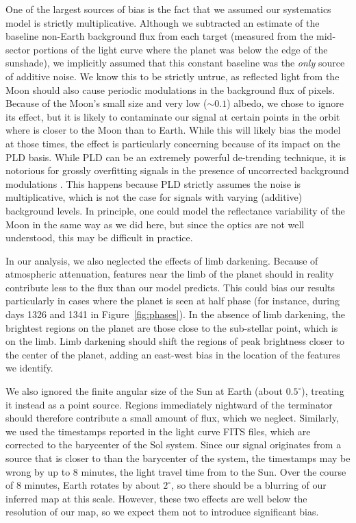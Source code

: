 \documentclass[modern]{aastex62}
\begin{document}
One of the largest sources of bias is the fact that we assumed our
systematics model is strictly multiplicative. Although we subtracted
an estimate of the baseline non-Earth background flux from each target
(measured from the mid-sector portions of the light curve where the
planet was below the edge of the sunshade), we implicitly assumed
that this constant baseline was the \emph{only} source of additive
noise. We know this to be strictly untrue, as reflected light from the Moon 
should also cause periodic modulations
in the background flux of \TESS pixels. Because of the Moon's small size and
very low ($\sim 0.1$) albedo, we chose to ignore its effect, but it
is likely to contaminate our signal at certain points in the orbit
where \TESS is closer to the Moon than to Earth. While this will
likely bias the \starry model at those times, the effect is particularly
concerning because of its impact on the PLD basis. While PLD can be an
extremely powerful de-trending technique, it is notorious for
grossly overfitting signals in the presence of uncorrected background
modulations \citep{Luger2016}. This happens because PLD strictly
assumes the noise is multiplicative, which is not the case for 
signals with varying (additive) background levels. In principle, one
could model the reflectance variability of the Moon in the same way as
we did here, but since the optics are not well understood, this 
may be difficult in practice. 

In our analysis, we also neglected the effects of limb darkening. Because of
atmospheric attenuation, features near the limb of the planet should in
reality contribute less to the flux than our model predicts. This could
bias our results particularly in cases where the planet is seen at half
phase (for instance, during days 1326 and 1341 in Figure~\ref{fig:phases}).
In the absence of limb darkening, the brightest regions on the planet are those
close to the sub-stellar point, which is on the limb. Limb darkening should
shift the regions of peak brightness closer to the center of the planet, adding
an east-west bias in the location of the features we identify.

We also ignored the finite angular size of the Sun at Earth (about $0.5^\circ$),
treating it instead as a point source. Regions immediately nightward of the 
terminator should therefore contribute a small amount of flux, which we neglect.
Similarly, we used the timestamps reported in the \tess light curve
FITS files, which are corrected to the barycenter of the Sol system. Since
our signal originates from a source that is closer to \tess than the
barycenter of the system, the timestamps may be wrong by up to 8 minutes,
the light travel time from \tess to the Sun. Over the course of 8 minutes, Earth rotates
by about $2^\circ$, so there should be a blurring of our inferred map at
this scale. However, these two effects
are well below the resolution of our map, so we expect
them not to introduce significant bias.
\end{document}
